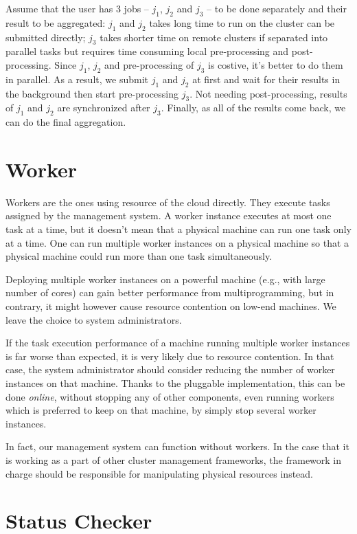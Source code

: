 {Assume that the user has 3 jobs -- $j_1$, $j_2$ and $j_3$ -- to be done
separately and their result to be aggregated:  $j_1$ and $j_2$ takes
long time to run on the cluster can be submitted directly; $j_3$ takes
shorter time on remote clusters if separated into parallel tasks but
requires time consuming local pre-processing and post-processing.
Since $j_1$, $j_2$ and pre-processing of $j_3$ is costive, it's better
to do them in parallel.
As a result, we submit $j_1$ and $j_2$ at first and wait for their
results in the background then start pre-processing $j_3$. Not needing
post-processing, results of $j_1$ and $j_2$ are synchronized after
$j_3$.
Finally, as all of the results come back, we can do the final
aggregation.

\section{Worker}

Workers are the ones using resource of the cloud directly.
They execute tasks assigned by the management system.
A worker instance executes at most one task at a time, but it doesn't
mean that a physical machine can run one task only at a time.
One can run multiple worker instances on a physical machine so that a
physical machine could run more than one task simultaneously.	 

Deploying multiple worker instances on a powerful machine (e.g., with
large number of cores) can gain better performance from
multiprogramming, but in contrary, it might however cause resource
contention on low-end machines.
We leave the choice to system administrators.


If the task execution performance of a machine running multiple worker
instances is far worse than expected, it is very likely due to resource
contention.
In that case, the system administrator should consider reducing the
number of worker instances on that machine.
Thanks to the pluggable implementation, this can be done \emph{online},
without stopping any of other components, even running workers which is
preferred to keep on that machine, by simply stop several worker
instances.

In fact, our management system can function without workers.
In the case that it is working as a part of other cluster management
frameworks, the framework in charge should be responsible for
manipulating physical resources instead.

\section{Status Checker}

}
